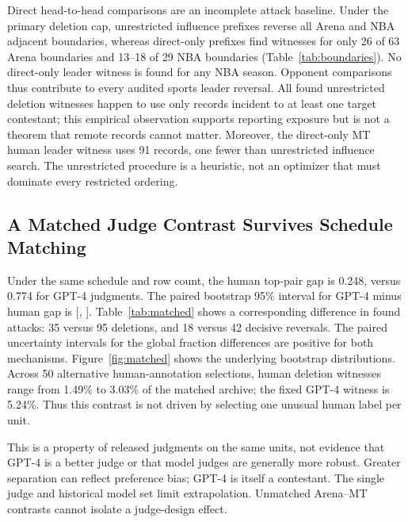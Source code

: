\documentclass{article}
\begin{document}
Direct head-to-head comparisons are an incomplete attack baseline. Under the primary deletion cap, unrestricted influence prefixes reverse all Arena and NBA adjacent boundaries, whereas direct-only prefixes find witnesses for only 26 of 63 Arena boundaries and 13--18 of 29 NBA boundaries (Table~\ref{tab:boundaries}). No direct-only leader witness is found for any NBA season. Opponent comparisons thus contribute to every audited sports leader reversal. All found unrestricted deletion witnesses happen to use only records incident to at least one target contestant; this empirical observation supports reporting exposure but is not a theorem that remote records cannot matter. Moreover, the direct-only MT human leader witness uses 91 records, one fewer than unrestricted influence search. The unrestricted procedure is a heuristic, not an optimizer that must dominate every restricted ordering.

\subsection{A Matched Judge Contrast Survives Schedule Matching}
\begin{table}[t]
\caption{Fixed GPT-4--Claude leading-pair comparison on \MatchedN{} identical MT-Bench units. The exploratory cap is 20\%. Intervals are paired question-bootstrap percentiles for differences in \emph{found} budget fractions, not for the unknown optimal attacks. ``pp'' denotes percentage points.}
\label{tab:matched}
\centering\small
\end{table}

Under the same schedule and row count, the human top-pair gap is 0.248, versus 0.774 for GPT-4 judgments. The paired bootstrap 95\% interval for GPT-4 minus human gap is [\MatchedGapDiffLo{}, \MatchedGapDiffHi{}]. Table~\ref{tab:matched} shows a corresponding difference in found attacks: 35 versus 95 deletions, and 18 versus 42 decisive reversals. The paired uncertainty intervals for the global fraction differences are positive for both mechanisms. Figure~\ref{fig:matched} shows the underlying bootstrap distributions. Across 50 alternative human-annotation selections, human deletion witnesses range from 1.49\% to 3.03\% of the matched archive; the fixed GPT-4 witness is 5.24\%. Thus this contrast is not driven by selecting one unusual human label per unit.

This is a property of released judgments on the same units, not evidence that GPT-4 is a better judge or that model judges are generally more robust. Greater separation can reflect preference bias; GPT-4 is itself a contestant. The single judge and historical model set limit extrapolation. Unmatched Arena--MT contrasts cannot isolate a judge-design effect.
\end{document}

